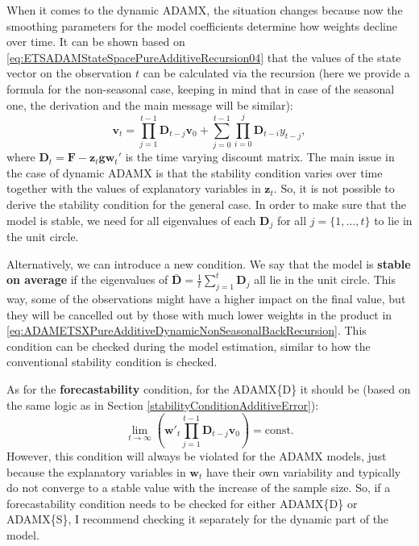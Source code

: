 \documentclass[]{book}
\theoremstyle{definition}
\theoremstyle{definition}
\theoremstyle{definition}
\theoremstyle{definition}
\theoremstyle{remark}
\begin{document}
When it comes to the dynamic ADAMX, the situation changes because now the smoothing parameters for the model coefficients determine how weights decline over time. It can be shown based on \eqref{eq:ETSADAMStateSpacePureAdditiveRecursion04} that the values of the state vector on the observation \(t\) can be calculated via the recursion (here we provide a formula for the non-seasonal case, keeping in mind that in case of the seasonal one, the derivation and the main message will be similar):
\begin{equation}
  \mathbf{v}_{t} = \prod_{j=1}^{t-1}\mathbf{D}_{t-j} \mathbf{v}_{0} + \sum_{j=0}^{t-1} \prod_{i=0}^{j} \mathbf{D}_{t-i} y_{t-j},
  \label{eq:ADAMETSXPureAdditiveDynamicNonSeasonalBackRecursion}
\end{equation}
where \(\mathbf{D}_t=\mathbf{F} -\mathbf{z}_t \mathbf{g} \mathbf{w}_{t}'\) is the time varying discount matrix. The main issue in the case of dynamic ADAMX is that the stability condition varies over time together with the values of explanatory variables in \(\mathbf{z}_t\). So, it is not possible to derive the stability condition for the general case. In order to make sure that the model is stable, we need for all eigenvalues of each \(\mathbf{D}_{j}\) for all \(j=\{1,\dots,t\}\) to lie in the unit circle.

Alternatively, we can introduce a new condition. We say that the model is \textbf{stable on average} if the eigenvalues of \(\mathbf{\bar{D}}=\frac{1}{t}\sum_{j=1}^t\mathbf{D}_j\) all lie in the unit circle. This way, some of the observations might have a higher impact on the final value, but they will be cancelled out by those with much lower weights in the product in \eqref{eq:ADAMETSXPureAdditiveDynamicNonSeasonalBackRecursion}. This condition can be checked during the model estimation, similar to how the conventional stability condition is checked.

As for the \textbf{forecastability} condition, for the ADAMX\{D\} it should be (based on the same logic as in Section \ref{stabilityConditionAdditiveError}):
\begin{equation}
  \lim\limits_{t\rightarrow\infty}\left(\mathbf{w}'_{t}\prod_{j=1}^{t-1}\mathbf{D}_{t-j} \mathbf{v}_{0}\right) = \text{const} .
  \label{eq:ADAMETSXPureAdditiveDynamicNonSeasonalBackForecastability}
\end{equation}
However, this condition will always be violated for the ADAMX models, just because the explanatory variables in \(\mathbf{w}_{t}\) have their own variability and typically do not converge to a stable value with the increase of the sample size. So, if a forecastability condition needs to be checked for either ADAMX\{D\} or ADAMX\{S\}, I recommend checking it separately for the dynamic part of the model.
\end{document}
